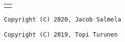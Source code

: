 \begin{center}
  \vspace*{1cm}
  \begin{tabular}{c}
    \textbf{}
  \end{tabular}
  \vfill
  \texttt{}
  \vfill

  \vspace{0.8cm}
  \texttt{Copyright (C) 2020, Jacob Salmela}

  \texttt{Copyright (C) 2019, Topi Turunen}
\end{center}
